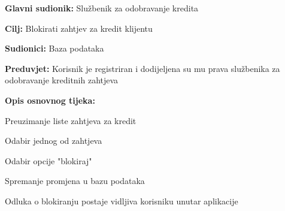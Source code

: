             
                \noindent {}
                \begin{packed_item}
                
                  \item \textbf{Glavni sudionik: } Službenik za odobravanje kredita
                  \item  \textbf{Cilj:} Blokirati zahtjev za kredit klijentu
                  \item  \textbf{Sudionici:} Baza podataka
                  \item  \textbf{Preduvjet:} Korisnik je registriran i dodijeljena su mu prava službenika za odobravanje kreditnih zahtjeva 
                  \item  \textbf{Opis osnovnog tijeka:}
                  
                  \item[] \begin{packed_enum}
                
                    \item Preuzimanje liste zahtjeva za kredit
                    \item Odabir jednog od zahtjeva 
                    \item Odabir opcije "blokiraj"
                    \item Spremanje promjena u bazu podataka
                    \item Odluka o blokiranju postaje vidljiva korisniku unutar aplikacije
                    
                      \end{packed_enum}
                    \end{packed_item}
                
